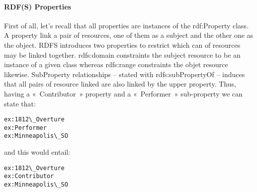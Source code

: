 \paragraph{RDF(S) Properties}
First of all, let's recall that all properties are instances of the rdf:Property class. A property link a pair of resources, one of them as a subject and the other one as the object. 
RDFS introduces two properties to restrict which can of resources may be linked together. rdfs:domain constraints the subject resource to be an instance of a given class whereas rdfs:range constraints the objet resource likewise. 
SubProperty relationships – stated with rdfs:subPropertyOf – induces that all pairs of resource linked are also linked by the upper property. 
Thus, having a « Contributor » property and a « Performer » sub-property we can state that:
\begin{Verbatim}[fontsize=\small,formatcom=\color{black!70}]
ex:1812\_Overture
ex:Performer
ex:Minneapolis\_SO
\end{Verbatim}
and this would entail:
\begin{Verbatim}[fontsize=\small,formatcom=\color{black!70}]
ex:1812\_Overture
ex:Contributor
ex:Minneapolis\_SO
\end{Verbatim}

